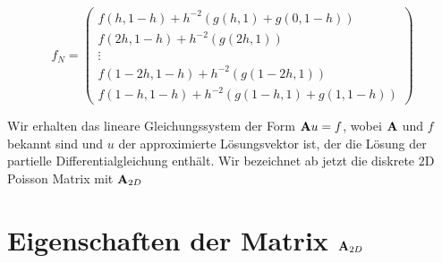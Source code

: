 \begin{equation}
f_{N} = 
\begin{pmatrix}
f(h,1-h) + h^{-2}(g(h,1)+g(0,1-h)) \\
f(2h,1-h) + h^{-2}(g(2h,1)) \\
\vdots \\
f(1-2h,1-h) + h^{-2}(g(1-2h,1)) \\
f(1-h,1-h) + h^{-2}(g(1-h,1)+g(1,1-h))
\end{pmatrix}
\end{equation}

Wir erhalten das lineare Gleichungssystem der Form ${\textbf{A}}u = f$, wobei ${\textbf{A}}$ und $f$ bekannt sind und $u$ der approximierte Lösungsvektor ist, der die Lösung der partielle Differentialgleichung enthält. Wir bezeichnet ab jetzt die diskrete 2D Poisson Matrix mit ${\textbf{A}}_{2D}$







\section{Eigenschaften der Matrix ${\textbf{A}}_{2D}$}\label{s.Eigenwerte und Eigenvektoren}

